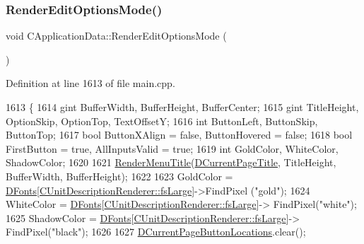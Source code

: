 \subsubsection{\texorpdfstring{Render\+Edit\+Options\+Mode()}{RenderEditOptionsMode()}}
{\footnotesize\ttfamily void C\+Application\+Data\+::\+Render\+Edit\+Options\+Mode (\begin{DoxyParamCaption}{ }\end{DoxyParamCaption})\hspace{0.3cm}{\ttfamily [protected]}}



Definition at line 1613 of file main.\+cpp.


\begin{DoxyCode}
1613                                             \{
1614     gint BufferWidth, BufferHeight, BufferCenter;
1615     gint TitleHeight, OptionSkip, OptionTop, TextOffsetY;
1616     \textcolor{keywordtype}{int} ButtonLeft, ButtonSkip, ButtonTop;
1617     \textcolor{keywordtype}{bool} ButtonXAlign = \textcolor{keyword}{false}, ButtonHovered = \textcolor{keyword}{false};
1618     \textcolor{keywordtype}{bool} FirstButton = \textcolor{keyword}{true}, AllInputsValid = \textcolor{keyword}{true};
1619     \textcolor{keywordtype}{int} GoldColor, WhiteColor, ShadowColor;
1620     
1621     \hyperlink{classCApplicationData_a548c5924a281c7e226fd7cac44e59920}{RenderMenuTitle}(\hyperlink{classCApplicationData_a49ce7f0b5891f0f2c29b73aad636b761}{DCurrentPageTitle}, TitleHeight, BufferWidth, 
      BufferHeight); 
1622     
1623     GoldColor = \hyperlink{classCApplicationData_afde9247d0a3ea87393ec86dcdb1e8274}{DFonts}[\hyperlink{classCUnitDescriptionRenderer_a3ea4cd83b6dd9533ab3abb953a7da35aaf467097fe4f4811a5e2f1959c86e071d}{CUnitDescriptionRenderer::fsLarge}]->FindPixel
      (\textcolor{stringliteral}{"gold"});
1624     WhiteColor = \hyperlink{classCApplicationData_afde9247d0a3ea87393ec86dcdb1e8274}{DFonts}[\hyperlink{classCUnitDescriptionRenderer_a3ea4cd83b6dd9533ab3abb953a7da35aaf467097fe4f4811a5e2f1959c86e071d}{CUnitDescriptionRenderer::fsLarge}]->
      FindPixel(\textcolor{stringliteral}{"white"});
1625     ShadowColor = \hyperlink{classCApplicationData_afde9247d0a3ea87393ec86dcdb1e8274}{DFonts}[\hyperlink{classCUnitDescriptionRenderer_a3ea4cd83b6dd9533ab3abb953a7da35aaf467097fe4f4811a5e2f1959c86e071d}{CUnitDescriptionRenderer::fsLarge}]->
      FindPixel(\textcolor{stringliteral}{"black"});
1626     
1627     \hyperlink{classCApplicationData_a3615df8e23cea3ce17f11cf61340a7b4}{DCurrentPageButtonLocations}.clear();

\end{DoxyCode}
